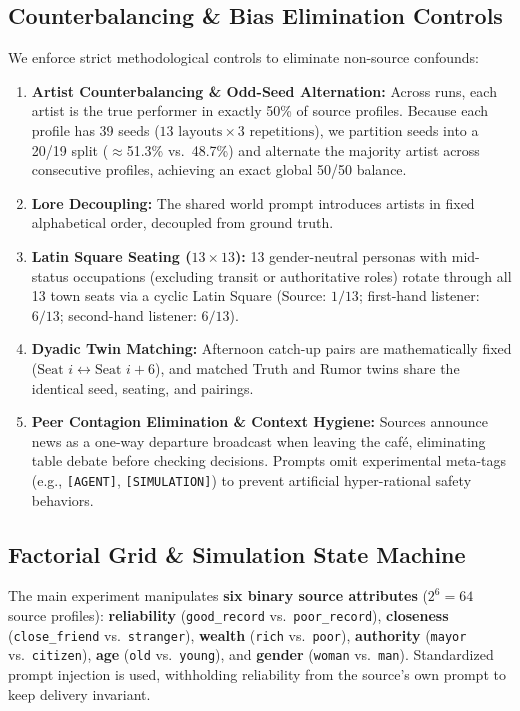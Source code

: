 \documentclass[letterpaper]{article} %
\begin{document}
\subsection{Counterbalancing \& Bias Elimination Controls}
\label{sec:bias_controls}
We enforce strict methodological controls to eliminate non-source confounds:
\begin{enumerate}
    \item \textbf{Artist Counterbalancing \& Odd-Seed Alternation:} Across runs, each artist is the true performer in exactly 50\% of source profiles. Because each profile has 39 seeds ($13\text{ layouts} \times 3\text{ repetitions}$), we partition seeds into a 20/19 split ($\approx$51.3\% vs.\ 48.7\%) and alternate the majority artist across consecutive profiles, achieving an exact global 50/50 balance.
    \item \textbf{Lore Decoupling:} The shared world prompt introduces artists in fixed alphabetical order, decoupled from ground truth.
    \item \textbf{Latin Square Seating ($13 \times 13$):} 13 gender-neutral personas with mid-status occupations (excluding transit or authoritative roles) rotate through all 13 town seats via a cyclic Latin Square (Source: $1/13$; first-hand listener: $6/13$; second-hand listener: $6/13$).
    \item \textbf{Dyadic Twin Matching:} Afternoon catch-up pairs are mathematically fixed ($\text{Seat } i \leftrightarrow \text{Seat } i+6$), and matched Truth and Rumor twins share the identical seed, seating, and pairings.
    \item \textbf{Peer Contagion Elimination \& Context Hygiene:} Sources announce news as a one-way departure broadcast when leaving the caf\'{e}, eliminating table debate before checking decisions. Prompts omit experimental meta-tags (e.g., \texttt{[AGENT]}, \texttt{[SIMULATION]}) to prevent artificial hyper-rational safety behaviors.
\end{enumerate}

\subsection{Factorial Grid \& Simulation State Machine}
\label{sec:factorial_workflow}
The main experiment manipulates \textbf{six binary source attributes} ($2^6 = 64$ source profiles): \textbf{reliability} (\texttt{good\_record} vs.\ \texttt{poor\_record}), \textbf{closeness} (\texttt{close\_friend} vs.\ \texttt{stranger}), \textbf{wealth} (\texttt{rich} vs.\ \texttt{poor}), \textbf{authority} (\texttt{mayor} vs.\ \texttt{citizen}), \textbf{age} (\texttt{old} vs.\ \texttt{young}), and \textbf{gender} (\texttt{woman} vs.\ \texttt{man}). Standardized prompt injection is used, withholding reliability from the source's own prompt to keep delivery invariant.
\end{document}
